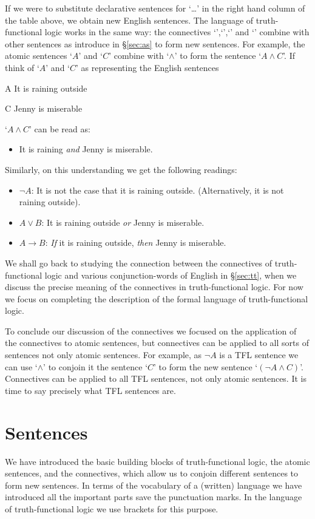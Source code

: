 If we were to substitute declarative sentences for `\dots' in the right hand column of the table above, we obtain new English sentences. The language of truth-functional logic works in the same way: the connectives `\enot',`\eand',`\eor' and `\eif' combine with other sentences as introduce in \S\ref{sec:as} to form new sentences. For example, the atomic sentences `$A$' and `$C$' combine
with `$\wedge$' to form the sentence `$A\wedge C$'. If think of `$A$' and `$C$' as representing the English sentences
\begin{ekey}
		\item[A] It is raining outside
		\item[C] Jenny is miserable
	\end{ekey}
`$A\wedge C$' can be read as:
\begin{itemize}
\item It is raining \emph{and} Jenny is miserable.
\end{itemize}
Similarly, on this understanding we get the following readings:
\begin{itemize}
\item $\neg A$: It is not the case that it is raining outside. (Alternatively, it is not raining outside).
\item $A\vee B$: It is raining outside \emph{or} Jenny is miserable.
\item $A\rightarrow B$: \emph{If} it is raining outside, \emph{then} Jenny is miserable.
 \end{itemize}
 We shall go back to studying the connection between the connectives of truth-functional logic and various conjunction-words of English in \S\ref{sec:tt}, when we discuss the precise meaning of the connectives in truth-functional logic. For now we focus on completing the description of the formal language of truth-functional logic.
 
 To conclude our discussion of the connectives we focused on the application of the connectives to atomic sentences, but connectives can be applied to all sorts of sentences not only atomic sentences. For example, as $\neg A$ is a TFL sentence we can use `$\wedge$' to conjoin it the sentence `$C$' to form the new sentence `$(\neg A\wedge C)$'. Connectives can be applied to all TFL sentences, not only atomic sentences. It is time to say precisely what TFL sentences are.
 
\section{Sentences}\label{s:TFLSentences}
We have introduced the basic building blocks of truth-functional logic, the atomic sentences, and the connectives, which allow us to conjoin different sentences to form new sentences. In terms of the vocabulary of a (written) language we have introduced all the important parts save the punctuation marks. In the language of truth-functional logic we use brackets for this purpose.

